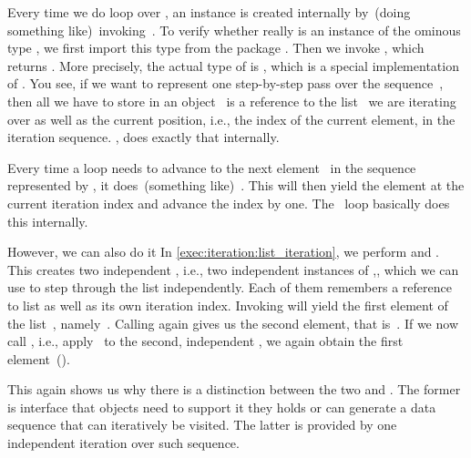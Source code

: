 Every time we do loop over , an  instance is created internally by~(doing something like)~invoking~.
To verify whether  really is an instance of the ominous type , we first import this type from the package .
Then we invoke , which returns .
More precisely, the actual type of  is , which is a special implementation of .
You see, if we want to represent one step-by-step pass over the sequence~, then all we have to store in an object~ is a reference to the list~ we are iterating over as well as the current position, i.e., the index of the current element, in the iteration sequence.
, does exactly that internally.

Every time a loop needs to advance to the next element~ in the sequence represented by , it does~(something like)~.
This will then yield the element at the current iteration index and advance the index by one.
The ~loop basically does this internally.

However, we can also do it 
In \cref{exec:iteration:list_iteration}, we perform  and .
This creates two independent , i.e., two independent instances of ,, which we can use to step through the list independently.
Each of them remembers a reference to list  as well as its own iteration index.
Invoking  will yield the first element of the list~, namely~.
Calling  again gives us the second element, that is~.
If we now call , i.e., apply~ to the second, independent , we again obtain the first element~().

This again shows us why there is a distinction between the two   and .
The former is interface that objects need to support it they holds or can generate a data sequence that can iteratively be visited.
The latter is provided by one independent iteration over such sequence.

